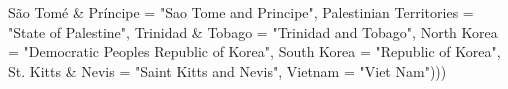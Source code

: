\documentclass[
  12pt,
]{article}
\newenvironment{Shaded}{}{}
\newcommand{\AttributeTok}[1]{\textcolor[rgb]{0.49,0.56,0.16}{#1}}
\newcommand{\NormalTok}[1]{#1}
\newcommand{\OtherTok}[1]{\textcolor[rgb]{0.00,0.44,0.13}{#1}}
\newcommand{\StringTok}[1]{\textcolor[rgb]{0.25,0.44,0.63}{#1}}
\begin{document}
\begin{Shaded}
\begin{Highlighting}[]
            \StringTok{\textasciigrave{}}\AttributeTok{São Tomé \& Príncipe}\StringTok{\textasciigrave{}} \OtherTok{=} \StringTok{"Sao Tome and Principe"}\NormalTok{, }
            \StringTok{\textasciigrave{}}\AttributeTok{Palestinian Territories}\StringTok{\textasciigrave{}} \OtherTok{=} \StringTok{"State of Palestine"}\NormalTok{, }
            \StringTok{\textasciigrave{}}\AttributeTok{Trinidad \& Tobago}\StringTok{\textasciigrave{}} \OtherTok{=} \StringTok{"Trinidad and Tobago"}\NormalTok{, }
            \StringTok{\textasciigrave{}}\AttributeTok{North Korea}\StringTok{\textasciigrave{}} \OtherTok{=} \StringTok{"Democratic People\textquotesingle{}s Republic of Korea"}\NormalTok{, }
            \StringTok{\textasciigrave{}}\AttributeTok{South Korea}\StringTok{\textasciigrave{}} \OtherTok{=} \StringTok{"Republic of Korea"}\NormalTok{, }
            \StringTok{\textasciigrave{}}\AttributeTok{St. Kitts \& Nevis}\StringTok{\textasciigrave{}} \OtherTok{=} \StringTok{"Saint Kitts and Nevis"}\NormalTok{, }
            \AttributeTok{Vietnam =} \StringTok{"Viet Nam"}\NormalTok{)))}


\end{Highlighting}
\end{Shaded}
\end{document}
